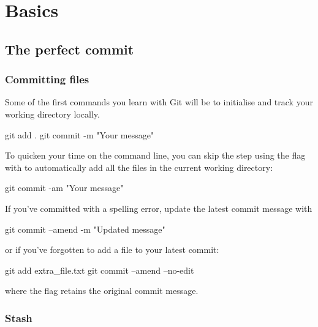 \chapter{Basics}

\section{The perfect commit}




\subsection{Committing files}

Some of the first commands you learn with Git will be to initialise and track your working directory locally.

\begin{git-bash}
    git add .
    git commit -m "Your message"
\end{git-bash}

To quicken your time on the command line, you can skip the  step using the  flag with  to automatically add all the files in the current working directory:

\begin{git-bash}
    git commit -am "Your message"
\end{git-bash}

If you've committed with a spelling error, update the latest commit message with

\begin{git-bash}
    git commit --amend -m "Updated message"
\end{git-bash}

\noindent or if you've forgotten to add a file to your latest commit:

\begin{git-bash}
    git add extra_file.txt
    git commit --amend --no-edit
\end{git-bash}

\noindent where the  flag retains the original commit message.



\subsection{Stash}

